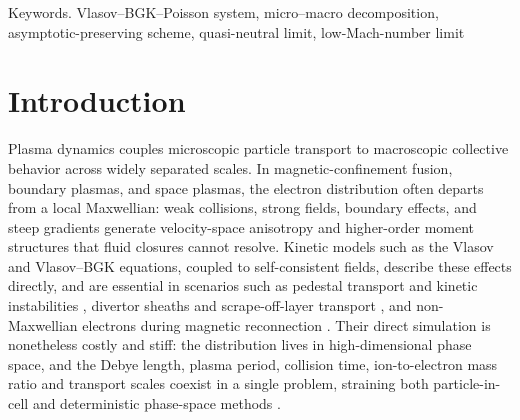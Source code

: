 \documentclass[pdflatex,final,10pt]{article}
\begin{document}
\vspace{0.1cm}

\noindent 
{\small\sc Keywords.}  {\small Vlasov--BGK--Poisson system, micro--macro decomposition, asymptotic-preserving scheme, quasi-neutral limit, low-Mach-number limit}

\tableofcontents

\section{Introduction}
Plasma dynamics couples microscopic particle transport to macroscopic collective behavior across widely separated scales. In magnetic-confinement fusion, boundary plasmas, and space plasmas, the electron distribution often departs from a local Maxwellian: weak collisions, strong fields, boundary effects, and steep gradients generate velocity-space anisotropy and higher-order moment structures that fluid closures cannot resolve. Kinetic models such as the Vlasov and Vlasov--BGK equations, coupled to self-consistent fields, describe these effects directly, and are essential in scenarios such as pedestal transport and kinetic instabilities \cite{wan2012global}, divertor sheaths and scrape-off-layer transport \cite{stangeby2000plasma}, and non-Maxwellian electrons during magnetic reconnection \cite{munoz2016nonmaxwellian}. Their direct simulation is nonetheless costly and stiff: the distribution lives in high-dimensional phase space, and the Debye length, plasma period, collision time, ion-to-electron mass ratio and transport scales coexist in a single problem, straining both particle-in-cell \cite{birdsall1991particle,hockney1988computer} and deterministic phase-space methods \cite{yang2021highly}.
\end{document}
